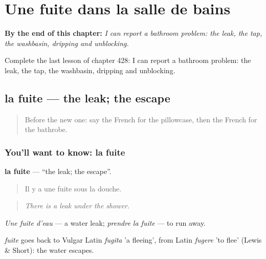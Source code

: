 
\chapter{Une fuite dans la salle de bains}
\label{ch:fr-une-fuite-dans-la-salle-de-bains}

\begin{chapteropening}
\textbf{By the end of this chapter:} \emph{I can report a bathroom problem: the leak, the tap, the washbasin, dripping and unblocking.}

Complete the last lesson of chapter 428: I can report a bathroom problem: the leak, the tap, the washbasin, dripping and unblocking.
\end{chapteropening}

\section[la fuite]{la fuite — the leak; the escape}

\label{lesson:FR-C428-fuite}



\begin{quote}
Before the new one: say the French for the pillowcase, then the French for the bathrobe.
\end{quote}

\subsection*{You'll want to know: la fuite}
\textbf{la fuite} — \textquotedblleft{}the leak; the escape\textquotedblright{}.

\begin{quote}
Il y a une fuite sous la douche.
\end{quote}

\begin{quote}
\emph{There is a leak under the shower.}
\end{quote}

\emph{Une fuite d'eau} — a water leak; \emph{prendre la fuite} — to run away.

\begin{cousinweb}
\emph{fuite} goes back to Vulgar Latin \emph{fugita} 'a fleeing', from Latin \emph{fugere} 'to flee' (Lewis \& Short): the water escapes.
\end{cousinweb}

